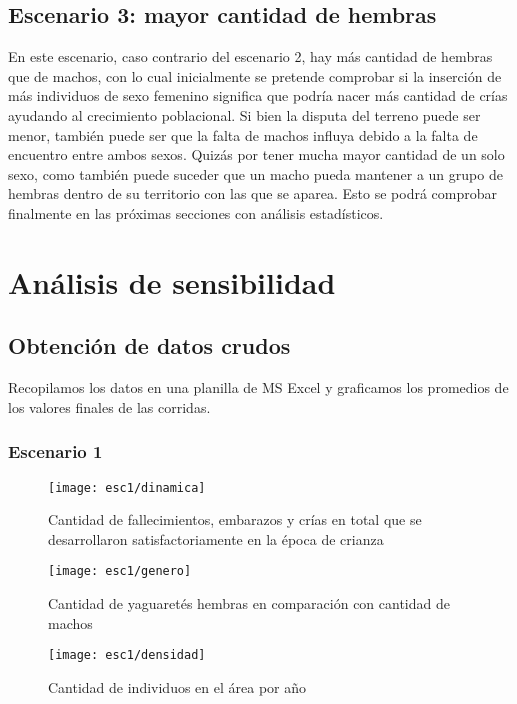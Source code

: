     \subsection{Escenario 3: mayor cantidad de hembras}
      En este escenario, caso contrario del escenario 2, hay más cantidad de hembras que de machos, con lo cual inicialmente se pretende comprobar si la inserción de más individuos de sexo femenino significa que podría nacer más cantidad de crías ayudando al crecimiento poblacional. Si bien la disputa del terreno puede ser menor, también puede ser que la falta de machos influya debido a la falta de encuentro entre ambos sexos. Quizás por tener mucha mayor cantidad de un solo sexo, como también puede suceder que un macho pueda mantener a un grupo de hembras dentro de su territorio con las que se aparea. Esto se podrá comprobar finalmente en las próximas secciones con análisis estadísticos.

    \section{Análisis de sensibilidad}

\subsection{Obtención de datos crudos}

Recopilamos los datos en una planilla de MS Excel y graficamos los promedios de los valores finales de las corridas.

\subsubsection{Escenario 1}

\begin{figure}[H]
    \texttt{[image: esc1/dinamica]}
    \caption{Cantidad de fallecimientos, embarazos y crías en total que se desarrollaron satisfactoriamente en la época de crianza}\label{fig:fig1-1}
    \endminipage\hfill
    \texttt{[image: esc1/genero]}
    \caption{Cantidad de yaguaretés hembras en comparación con cantidad de machos}\label{fig:fig1-2}
    \endminipage\hfill
    \texttt{[image: esc1/densidad]}
    \caption{Cantidad de individuos en el área por año}\label{fig:fig1-3}
    \endminipage
\end{figure}

